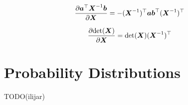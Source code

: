 \documentclass{article}
\begin{document}
\begin{align}
  \frac{\partial {\boldsymbol{{a}}}^\top {\boldsymbol{{X}}}^{-1} {\boldsymbol{{b}}}}{\partial {\boldsymbol{{X}}}}
    = - ({\boldsymbol{{X}}}^{-1})^\top {\boldsymbol{{a}}} {\boldsymbol{{b}}}^\top ({\boldsymbol{{X}}}^{-1})^\top
\end{align}

\begin{align}
  \frac{\partial \mathrm{det}({\boldsymbol{{X}}})}{\partial {\boldsymbol{{X}}}}
    = \mathrm{det}({\boldsymbol{{X}}}) ({\boldsymbol{{X}}}^{-1})^\top
\end{align}

\newpage
\section{Probability Distributions}
TODO(ilijar)
\end{document}
